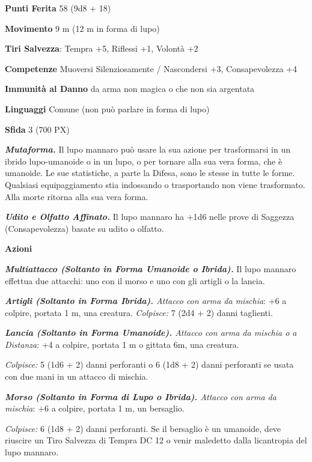 \begin{multicols}{2}
	\textbf{Punti Ferita} 58 (9d8 + 18)

	\textbf{Movimento} 9 m (12 m in forma di lupo)

	\textbf{Tiri Salvezza}: Tempra +5, Riflessi +1, Volontà +2

	\textbf{Competenze} Muoversi Silenziosamente / Nascondersi +3, Consapevolezza +4

	\textbf{Immunità al Danno} da arma non magica o che non sia argentata

	\textbf{Linguaggi} Comune (non può parlare in forma di lupo)

	\textbf{Sfida} 3 (700 PX)

	\textit{\textbf{Mutaforma.}} Il lupo mannaro può usare la sua azione per trasformarsi in un ibrido lupo-umanoide o in un lupo, o per tornare alla sua vera forma, che è umanoide. Le sue statistiche, a parte la Difesa, sono le stesse in tutte le forme. Qualsiasi equipaggiamento stia indossando o trasportando non viene trasformato. Alla morte ritorna alla sua vera forma.

	\textit{\textbf{Udito e Olfatto Affinato.}} Il lupo mannaro ha +1d6 nelle prove di Saggezza (Consapevolezza) basate su udito o olfatto.

	\textbf{Azioni}

	\textit{\textbf{Multiattacco (Soltanto in Forma Umanoide o Ibrida).}} Il lupo mannaro effettua due attacchi: uno con il morso e uno con gli artigli o la lancia.

	\textit{\textbf{Artigli (Soltanto in Forma Ibrida).} Attacco con arma da mischia}: +6 a colpire, portata 1 m, una creatura. \textit{Colpisce:} 7 (2d4 + 2) danni taglienti.

	\textit{\textbf{Lancia (Soltanto in Forma Umanoide).} Attacco con arma da mischia o a Distanza}: +4 a colpire, portata 1 m o gittata 6m, una creatura.

	\textit{Colpisce:} 5 (1d6 + 2) danni perforanti o 6 (1d8 + 2) danni perforanti se usata con due mani in un attacco di mischia.

	\textit{\textbf{Morso (Soltanto in Forma di Lupo o Ibrida).} Attacco con arma da mischia}: +6 a colpire, portata 1 m, un bersaglio.

	\textit{Colpisce:} 6 (1d8 + 2) danni perforanti. Se il bersaglio è un umanoide, deve riuscire un Tiro Salvezza di Tempra DC 12 o venir maledetto dalla licantropia del lupo mannaro.


\end{multicols}
